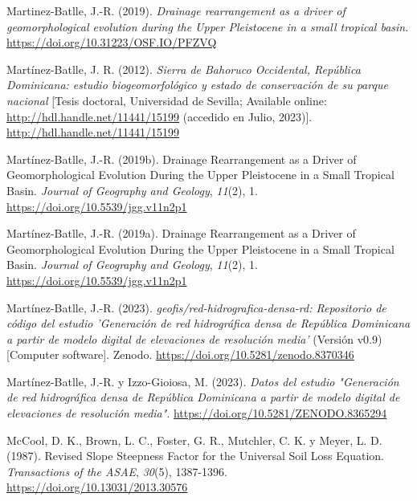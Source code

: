 \documentclass[spanish]{article}
\newlength{\cslhangindent}
\newlength{\cslentryspacingunit} %
\newenvironment{CSLReferences}[2] %
 {%
  \setlength{\parindent}{0pt}
  \ifodd #1
  \let\oldpar\par
  \def\par{\hangindent=\cslhangindent\oldpar}
  \fi
  \setlength{\parskip}{#2\cslentryspacingunit}
 }%
 {}
\begin{document}
\begin{CSLReferences}{1}{0}
\leavevmode{}%
Martinez-Batlle, J.-R. (2019). \emph{Drainage rearrangement as a driver
of geomorphological evolution during the Upper Pleistocene in a small
tropical basin}. \url{https://doi.org/10.31223/OSF.IO/PFZVQ}

\leavevmode{}%
Martínez-Batlle, J. R. (2012). \emph{{Sierra de Bahoruco Occidental,
República Dominicana: estudio biogeomorfológico y estado de conservación
de su parque nacional}} {[}Tesis doctoral, Universidad de Sevilla;
Available online: \url{http://hdl.handle.net/11441/15199} (accedido en
Julio, 2023){]}. \url{http://hdl.handle.net/11441/15199}

\leavevmode{}%
Martínez-Batlle, J.-R. (2019b). Drainage Rearrangement as a Driver of
Geomorphological Evolution During the Upper Pleistocene in a Small
Tropical Basin. \emph{Journal of Geography and Geology}, \emph{11}(2),
1. \url{https://doi.org/10.5539/jgg.v11n2p1}

\leavevmode{}%
Martínez-Batlle, J.-R. (2019a). Drainage Rearrangement as a Driver of
Geomorphological Evolution During the Upper Pleistocene in a Small
Tropical Basin. \emph{Journal of Geography and Geology}, \emph{11}(2),
1. \url{https://doi.org/10.5539/jgg.v11n2p1}

\leavevmode{}%
Martínez-Batlle, J.-R. (2023). \emph{{geofis/red-hidrografica-densa-rd:
Repositorio de código del estudio 'Generación de red hidrográfica densa
de República Dominicana a partir de modelo digital de elevaciones de
resolución media'}} (Versión v0.9) {[}Computer software{]}. Zenodo.
\url{https://doi.org/10.5281/zenodo.8370346}

\leavevmode{}%
Martínez-Batlle, J.-R. y Izzo-Gioiosa, M. (2023). \emph{Datos del
estudio "Generación de red hidrográfica densa de República Dominicana a
partir de modelo digital de elevaciones de resolución media"}.
\url{https://doi.org/10.5281/ZENODO.8365294}

\leavevmode{}%
McCool, D. K., Brown, L. C., Foster, G. R., Mutchler, C. K. y Meyer, L.
D. (1987). Revised Slope Steepness Factor for the Universal Soil Loss
Equation. \emph{Transactions of the ASAE}, \emph{30}(5), 1387-1396.
\url{https://doi.org/10.13031/2013.30576}


\end{CSLReferences}
\end{document}

